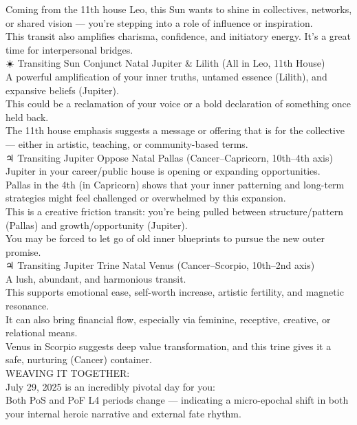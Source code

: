 \documentclass{article}
\begin{document}
Coming from the 11th house Leo, this Sun wants to shine in collectives,
networks, or shared vision --- you're stepping into a role of influence
or inspiration.\\
This transit also amplifies charisma, confidence, and initiatory energy.
It's a great time for interpersonal bridges.\\
☀️ Transiting Sun Conjunct Natal Jupiter \& Lilith (All in Leo, 11th
House)\\
A powerful amplification of your inner truths, untamed essence (Lilith),
and expansive beliefs (Jupiter).\\
This could be a reclamation of your voice or a bold declaration of
something once held back.\\
The 11th house emphasis suggests a message or offering that is for the
collective --- either in artistic, teaching, or community-based terms.\\
♃ Transiting Jupiter Oppose Natal Pallas (Cancer--Capricorn, 10th--4th
axis)\\
Jupiter in your career/public house is opening or expanding
opportunities.\\
Pallas in the 4th (in Capricorn) shows that your inner patterning and
long-term strategies might feel challenged or overwhelmed by this
expansion.\\
This is a creative friction transit: you're being pulled between
structure/pattern (Pallas) and growth/opportunity (Jupiter).\\
You may be forced to let go of old inner blueprints to pursue the new
outer promise.\\
♃ Transiting Jupiter Trine Natal Venus (Cancer--Scorpio, 10th--2nd
axis)\\
A lush, abundant, and harmonious transit.\\
This supports emotional ease, self-worth increase, artistic fertility,
and magnetic resonance.\\
It can also bring financial flow, especially via feminine, receptive,
creative, or relational means.\\
Venus in Scorpio suggests deep value transformation, and this trine
gives it a safe, nurturing (Cancer) container.\\
 WEAVING IT TOGETHER:\\
July 29, 2025 is an incredibly pivotal day for you:\\
Both PoS and PoF L4 periods change --- indicating a micro-epochal shift
in both your internal heroic narrative and external fate rhythm.\\
\end{document}

